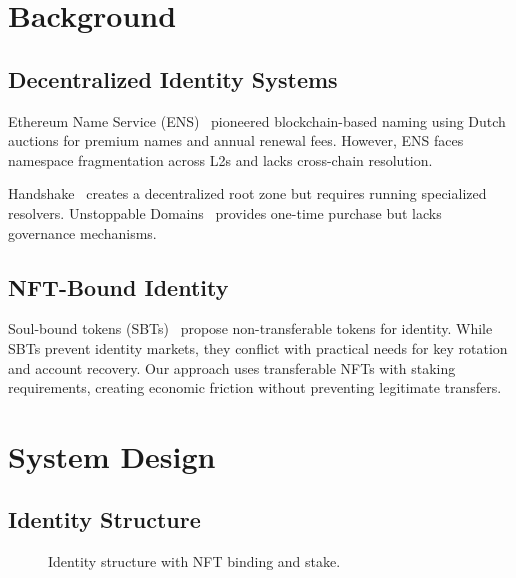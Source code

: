 \documentclass[11pt,twocolumn]{article}
\begin{document}
\section{Background}

\subsection{Decentralized Identity Systems}

Ethereum Name Service (ENS)~\cite{ens2017} pioneered blockchain-based naming using Dutch auctions for premium names and annual renewal fees. However, ENS faces namespace fragmentation across L2s and lacks cross-chain resolution.

Handshake~\cite{handshake2018} creates a decentralized root zone but requires running specialized resolvers. Unstoppable Domains~\cite{unstoppable2019} provides one-time purchase but lacks governance mechanisms.

\subsection{NFT-Bound Identity}

Soul-bound tokens (SBTs)~\cite{sbt2022} propose non-transferable tokens for identity. While SBTs prevent identity markets, they conflict with practical needs for key rotation and account recovery. Our approach uses transferable NFTs with staking requirements, creating economic friction without preventing legitimate transfers.

\section{System Design}

\subsection{Identity Structure}

\begin{figure}[t]
\centering
{}
\caption{Identity structure with NFT binding and stake.}
\label{fig:identity}
\end{figure}
\end{document}
